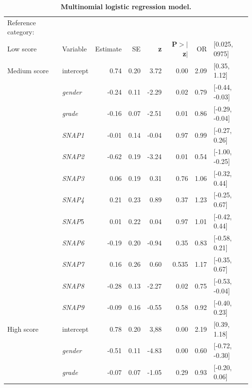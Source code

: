 \documentclass[10pt,letterpaper]{article}
\begin{document}
{{%
\begin{table}[H]
\centering
\caption{\bf Multinomial logistic regression model.} 
\begin{tabular}{|llrrrr|rl}
  \hline
Reference category: &&&&&&&\\
Low score & Variable &Estimate & SE & \textbf{z} & \textbf{P$>$$|$z$|$} &  OR &  [0.025, 0975]\\ 
 \hline
  \hline
Medium score & intercept  & 0.74 & 0.20 & 3.72 & 0.00 & 2.09 &  [0.35, 1.12] \\ 
\hline
  & {\it gender} & -0.24 & 0.11 & -2.29 & 0.02 & 0.79 & [-0.44, -0.03] \\ 
 \hline
  & {\it grade} & -0.16 & 0.07 & -2.51 & 0.01& 0.86 &  [-0.29, -0.04] \\ 
 \hline
  & {\it SNAP1} & -0.01 & 0.14 & -0.04 & 0.97 & 0.99 & [-0.27, 0.26] \\ 
  \hline
  &  {\it SNAP2} & -0.62 & 0.19 & -3.24 & 0.01 & 0.54 & [-1.00, -0.25] \\ 
  \hline
  &  {\it SNAP3} & 0.06 & 0.19 & 0.31 & 0.76 & 1.06 & [-0.32, 0.44] \\ 
  \hline
  & {\it SNAP4} & 0.21 & 0.23 & 0.89 & 0.37 & 1.23 & [-0.25, 0.67] \\ 
  \hline
  &  {\it SNAP}5 & 0.01 & 0.22 & 0.04 & 0.97 & 1.01 &[-0.42, 0.44]\\ 
  \hline
  &  {\it SNAP6} & -0.19 & 0.20 & -0.94 & 0.35 &  0.83 & [-0.58, 0.21] \\ 
   \hline
  &  {\it SNAP7} & 0.16 & 0.26 & 0.60 & 0.535& 1.17 & [-0.35, 0.67] \\ 
  \hline
  &  {\it SNAP8} & -0.28 & 0.13 & -2.27 & 0.02 & 0.75 & [-0.53, -0.04] \\ 
  \hline
  &  {\it SNAP9} & -0.09 & 0.16 & -0.55 & 0.58 & 0.92 & [-0.40, 0.23] \\ 
   \hline
   \hline
   High score & intercept & 0.78 & 0.20 & 3,88 & 0.00 & 2.19 & [0.39, 1.18] \\ 
  \hline
  &  {\it gender} & -0.51 & 0.11 & -4.83 & 0.00 & 0.60 & [-0.72, -0.30] \\ 
 \hline
 &  {\it grade} & -0.07 & 0.07 & -1.05 & 0.29 & 0.93 & [-0.20, 0.06] \\ 

\end{tabular}
\end{table}}}
\end{document}
